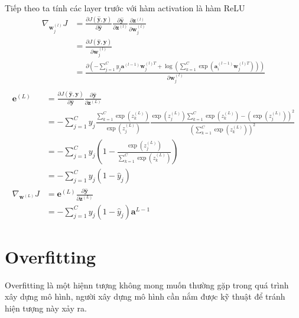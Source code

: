 Tiếp theo ta tính các layer trước với hàm activation là hàm ReLU
\begin{equation}
\begin{split}
\nabla_{\textbf{w}^{(l)}_j}J  &= \frac{\partial J(\widehat{\textbf{y}},\textbf{y}) }{\partial \widehat{\textbf{y}}} \frac{\partial  \widehat{\textbf{y}}}{\partial \textbf{z}^{(l)}} \frac{\partial \textbf{z}^{(l)}}{\partial \textbf{w}^{(l)}_j}\\
&= \frac{\partial J(\widehat{\textbf{y}},\textbf{y}) }{\partial \textbf{w}^{(l)}_j}\\
&=\frac{\partial \left( -\sum^C_{j=1} y_{j} \textbf{a}^{(l-1)}\textbf{w}^{(l)T}_{j} + \log\left(\sum_{k=1}^C \exp(\textbf{a}^{(l-1)}_i\textbf{w}^{(l)T}_{j})\right) \right)}{\partial \textbf{w}^{(l)}_j}\\
\end{split}
\end{equation}
\begin{equation}
\begin{split}
\textbf{e}^{(L)} &= \frac{\partial J(\widehat{\textbf{y}},\textbf{y}) }{\partial \widehat{\textbf{y}}} \frac{\partial  \widehat{\textbf{y}}}{\partial \textbf{z}^{(L)}} \\
& = -\sum^{C}_{j=1}y_{j}\frac{\sum^C_{k=1}\exp{(z^{(L)}_k)}}{\exp{(z^{(L)}_j)}} \frac{\exp(z^{(L)}_j) \sum^C_{k=1}\exp(z^{(L)}_k) - \left(\exp(z^{(L)}_{j})\right)^2}{\left(\sum^C_{k=1}\exp(z^{(L)}_k)\right)^2}\\
&= -\sum^{C}_{j=1}y_{j}\left(1-\frac{\exp(z^{(L)}_j)}{\sum^C_{k=1}\exp(z^{(L)}_k)}\right)\\
& = -\sum^{C}_{j=1}y_{j} \left( 1-\widehat{y}_j \right)\\
\nabla_{\textbf{w}^{(L)}}J
&=\textbf{e}^{(L)}\frac{\partial  \widehat{\textbf{y}}}{\partial \textbf{z}^{(L)}}\\
&=-\sum^{C}_{j=1}y_{j} \left( 1-\widehat{y}_j \right) \textbf{a}^{L-1}
\end{split}
\end{equation}

\section{Overfitting}
Overfitting là một hiệnn tượng không mong muốn thường gặp trong quá trình xây dựng mô hình, người xây dựng mô hình cần nắm được kỹ thuật để tránh hiện tượng này xảy ra.
